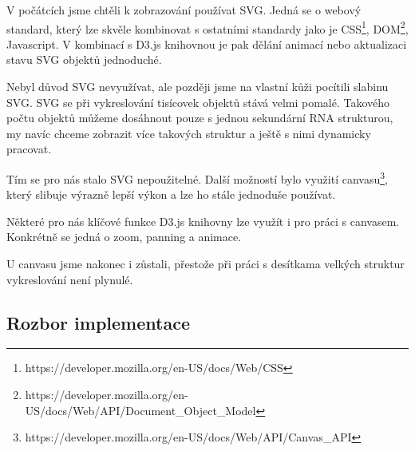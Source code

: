 V počátcích jsme chtěli k zobrazování používat SVG. Jedná se o webový standard,
který lze skvěle kombinovat s ostatními standardy jako je
CSS\footnote{https://developer.mozilla.org/en-US/docs/Web/CSS},
DOM\footnote{https://developer.mozilla.org/en-US/docs/Web/API/Document\_Object\_Model},
Javascript. V kombinací s D3.js knihovnou je pak dělání animací nebo
aktualizaci stavu SVG objektů jednoduché.

Nebyl důvod SVG nevyužívat, ale později jsme na vlastní kůži pocítili slabinu
SVG. SVG se při vykreslování tisícovek objektů stává velmi pomalé. Takového
počtu objektů můžeme dosáhnout pouze s jednou sekundární RNA strukturou, my
navíc chceme zobrazit více takových struktur a ještě s nimi dynamicky pracovat. 

Tím se pro nás stalo SVG nepoužitelné. Další možností bylo využití
canvasu\footnote{https://developer.mozilla.org/en-US/docs/Web/API/Canvas\_API},
který slibuje výrazně lepší výkon a lze ho stále jednoduše používat.

Některé pro nás klíčové funkce D3.js knihovny lze využít i pro práci s
canvasem. Konkrétně se jedná o zoom, panning a animace.

U canvasu jsme nakonec i zůstali, přestože při práci s desítkama velkých
struktur vykreslování není plynulé.

\subsection{Rozbor implementace}
